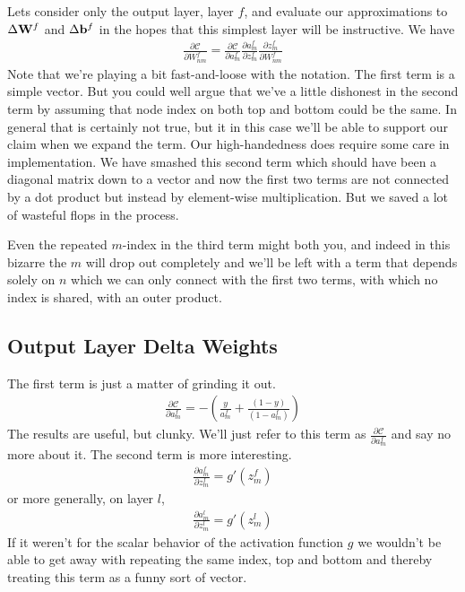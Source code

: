 \documentclass[twocolumn]{revtex4-1}
\newcommand{\bld}[1]{\vectorbold{#1}}
\newcommand{\cC}{\mathscr{C}}
\newcommand{\parpar}[2]{\frac{\partial #1}{\partial #2}}
\begin{document}
Lets consider only the output layer, layer $f$, and evaluate our approximations to $\Delta \bld{W}^f$ and $\Delta \bld{b}^f$ in the hopes that this simplest layer will be instructive. We have
\begin{align}
    \parpar{\cC}{W^f_{n m}} = \parpar{\cC}{a^f_m} \parpar{a^f_m}{z^f_m} \parpar{z^f_m}{W^f_{n m}}
\end{align}
Note that we're playing a bit fast-and-loose with the notation. The first term is a simple vector. But you could well argue that we've a little dishonest in the second term by assuming that node index on both top and bottom could be the same. In general that is certainly not true, but it in this case we'll be able to support our claim when we expand the term. Our high-handedness does require some care in implementation. We have smashed this second term which should have been a diagonal matrix down to a vector and now the first two terms are not connected by a dot product but instead by element-wise multiplication. But we saved a lot of wasteful flops in the process. 

Even the repeated $m$-index in the third term might both you, and indeed in this bizarre the $m$ will drop out completely and we'll be left with a term that depends solely on $n$ which we can only connect with the first two terms, with which no index is shared, with an outer product.


\subsection{Output Layer Delta Weights}
The first term is just a matter of grinding it out.
\begin{align}
    \label{eqn:costWRTaF}
    \parpar{\cC}{a^f_m} = - \left(\frac{y}{a^f_m} + \frac{(1 - y)}{(1 - a^f_m)}\right)
\end{align}
The results are useful, but clunky. We'll just refer to this term as $\parpar{\cC}{a^f_m}$ and say no more about it. The second term is more interesting.
\begin{align}
    \label{eqn:aWRTzF}
    \parpar{a^f_m}{z^f_m} = g'(z^f_m)
\end{align}
or more generally, on layer $l$,
\begin{align}
    \label{eqn:aWRTzL}
    \parpar{a^l_m}{z^l_m} = g'(z^l_m)
\end{align}
If it weren't for the scalar behavior of the activation function $g$ we wouldn't be able to get away with repeating the same index, top and bottom and thereby treating this term as a funny sort of vector.
\end{document}
